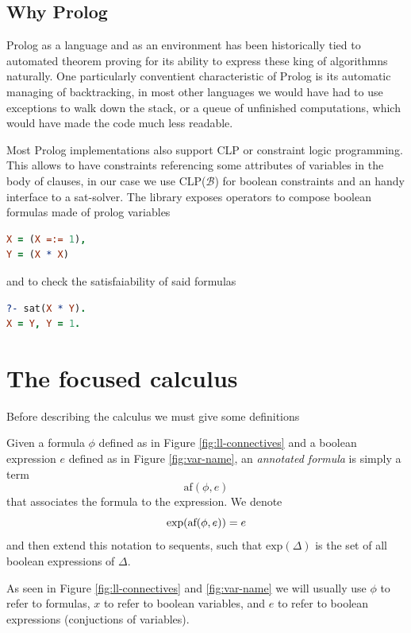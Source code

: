 \documentclass[a4paper, 12pt, tesi, english]{report}
\begin{document}
\section{Why Prolog}
Prolog as a language and as an environment has been historically tied to automated theorem proving for its ability to express these king of algorithmns naturally.
One particularly conventient characteristic of Prolog is its automatic managing of backtracking, in most other languages we would have had to use exceptions to walk down the stack, or a queue of unfinished computations, which would have made the code much less readable.

Most Prolog implementations also support CLP or constraint logic programming.
This allows to have constraints referencing some attributes of variables in the body of clauses, in our case we use CLP($\mathcal{B}$) for boolean constraints and an handy interface to a sat-solver.
The library exposes operators to compose boolean formulas made of prolog variables
\begin{lstlisting}[language=prolog, numbers=none]
X = (X =:= 1),
Y = (X * X)
\end{lstlisting}
and to check the satisfaiability of said formulas
\begin{lstlisting}[language=prolog, numbers=none]
?- sat(X * Y).
X = Y, Y = 1.
\end{lstlisting}

\chapter{The focused calculus}
Before describing the calculus we must give some definitions


\begin{define}
	Given a formula $\phi$ defined as in Figure \ref{fig:ll-connectives} and a boolean expression
	$e$ defined as in Figure \ref{fig:var-name}, an \textit{annotated formula} is simply a term 
	$$ \text{af}(\phi, e) $$
	that associates the formula to the expression.
	We denote 
	$$ \text{exp}(\text{af}(\phi, e)) = e $$
	and then extend this notation to sequents, such that $ \text{exp}(\Delta) $ is the set of all boolean expressions of $\Delta$.
\end{define}
As seen in Figure \ref{fig:ll-connectives} and \ref{fig:var-name} we will usually use $\phi$ to refer to formulas, $x$ to refer to boolean variables, and $e$ to refer to boolean expressions (conjuctions of variables).
\end{document}
